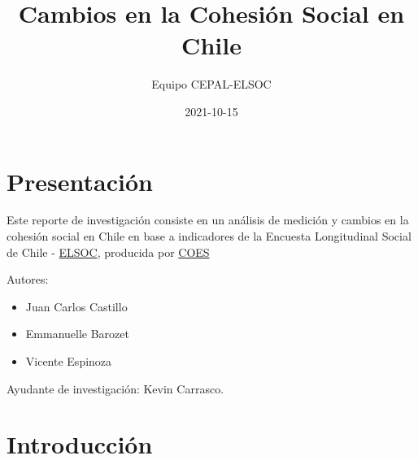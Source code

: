 \documentclass[
  12pt,
]{book}
\title{Cambios en la Cohesión Social en Chile}
\author{Equipo CEPAL-ELSOC}
\date{2021-10-15}
\providecommand{\tightlist}{%
  \setlength{\itemsep}{0pt}\setlength{\parskip}{0pt}}
\begin{document}
\maketitle

{
\hypersetup{linkcolor=}
\setcounter{tocdepth}{1}
\tableofcontents
}
\listoftables
\listoffigures
{}
\hypertarget{presentaciuxf3n}{%
\chapter*{Presentación}\label{presentaciuxf3n}}

Este reporte de investigación consiste en un análisis de medición y cambios en la cohesión social en Chile en base a indicadores de la Encuesta Longitudinal Social de Chile - \href{https://coes.cl/encuesta-panel/}{ELSOC}, producida por \href{https://coes.cl/}{COES}

Autores:

\begin{itemize}
\tightlist
\item
  Juan Carlos Castillo
\item
  Emmanuelle Barozet
\item
  Vicente Espinoza
\end{itemize}

Ayudante de investigación: Kevin Carrasco.

\hypertarget{introducciuxf3n}{%
\chapter*{Introducción}\label{introducciuxf3n}}
\end{document}
